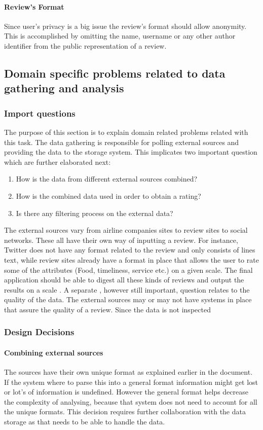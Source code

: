 \documentclass{article}
\begin{document}
\paragraph{Review's Format} Since user's privacy is a big issue the review's format should allow anonymity. This is accomplished by omitting the name, username or any other author 
identifier from the public representation of a review.

\subsection{Domain specific problems related to data gathering and analysis}
\subsubsection{Import questions}
The purpose of this section is to explain domain related problems related with this task. The data gathering is responsible for polling external sources and providing the data to the storage system. This implicates two important question which are further elaborated next:
\begin{enumerate}
\item	How is the data from different external sources combined?
\item	How is the combined data used in order to obtain a rating?
\item	Is there any filtering process on the external data?
\end{enumerate}
The external sources vary from airline companies sites to review sites to social networks. These all have their own way of inputting a review. For instance, Twitter does not have any format related to the review and only consists of lines text, while review sites already have  a format in place that allows the user to rate some of the attributes (Food, timeliness, service etc.) on a given scale. The final application should be able to digest all these kinds of reviews and output the results on a scale . 
A separate , however still important, question relates to the quality of the data. The external sources may or may not have systems in place that assure the quality of a review. Since the data is not inspected 

\subsubsection{Design Decisions}

\paragraph{Combining external sources}
The sources have their own unique format as explained earlier in the document. If the system where to parse this into a general format information might get lost or lot's of information is undefined.
However the general format helps decrease the complexity of analysing, because that system does not need to account for all the unique formats. This decision requires further collaboration with the data storage
as that needs to be able to handle the data. 
\end{document}
